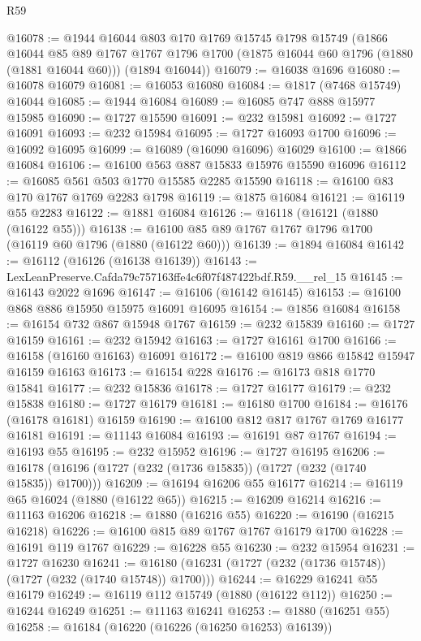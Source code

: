 \begin{lexlean}{R59}
\begin{coremodule}
@16078 := @1944
    @16044
    @803
    @170
    @1769
    @15745
    @1798
    @15749
    (@1866
      @16044
      @85
      @89
      @1767
      @1767
      @1796
      @1700
      (@1875 @16044 @60 @1796 (@1880 (@1881 @16044 @60)))
      (@1894 @16044))
@16079 := @16038 @1696
@16080 := @16078 @16079
@16081 := @16053 @16080
@16084 := @1817 (@7468 @15749) @16044
@16085 := @1944 @16084
@16089 := @16085 @747 @888 @15977 @15985
@16090 := @1727 @15590
@16091 := @232 @15981
@16092 := @1727 @16091
@16093 := @232 @15984
@16095 := @1727 @16093 @1700
@16096 := @16092 @16095
@16099 := @16089 (@16090 @16096) @16029
@16100 := @1866 @16084
@16106 := @16100 @563 @887 @15833 @15976 @15590 @16096
@16112 := @16085 @561 @503 @1770 @15585 @2285 @15590
@16118 := @16100 @83 @170 @1767 @1769 @2283 @1798
@16119 := @1875 @16084
@16121 := @16119 @55 @2283
@16122 := @1881 @16084
@16126 := @16118 (@16121 (@1880 (@16122 @55)))
@16138 := @16100 @85 @89 @1767 @1767 @1796 @1700 (@16119 @60 @1796 (@1880 (@16122 @60)))
@16139 := @1894 @16084
@16142 := @16112 (@16126 (@16138 @16139))
@16143 := LexLeanPreserve.Cafda79c757163ffe4c6f07f487422bdf.R59.__rel_15
@16145 := @16143 @2022 @1696
@16147 := @16106 (@16142 @16145)
@16153 := @16100 @868 @886 @15950 @15975 @16091 @16095
@16154 := @1856 @16084
@16158 := @16154 @732 @867 @15948 @1767
@16159 := @232 @15839
@16160 := @1727 @16159
@16161 := @232 @15942
@16163 := @1727 @16161 @1700
@16166 := @16158 (@16160 @16163) @16091
@16172 := @16100 @819 @866 @15842 @15947 @16159 @16163
@16173 := @16154 @228
@16176 := @16173 @818 @1770 @15841
@16177 := @232 @15836
@16178 := @1727 @16177
@16179 := @232 @15838
@16180 := @1727 @16179
@16181 := @16180 @1700
@16184 := @16176 (@16178 @16181) @16159
@16190 := @16100 @812 @817 @1767 @1769 @16177 @16181
@16191 := @11143 @16084
@16193 := @16191 @87 @1767
@16194 := @16193 @55
@16195 := @232 @15952
@16196 := @1727 @16195
@16206 := @16178 (@16196 (@1727 (@232 (@1736 @15835)) (@1727 (@232 (@1740 @15835)) @1700)))
@16209 := @16194 @16206 @55 @16177
@16214 := @16119 @65 @16024 (@1880 (@16122 @65))
@16215 := @16209 @16214
@16216 := @11163 @16206
@16218 := @1880 (@16216 @55)
@16220 := @16190 (@16215 @16218)
@16226 := @16100 @815 @89 @1767 @1767 @16179 @1700
@16228 := @16191 @119 @1767
@16229 := @16228 @55
@16230 := @232 @15954
@16231 := @1727 @16230
@16241 := @16180 (@16231 (@1727 (@232 (@1736 @15748)) (@1727 (@232 (@1740 @15748)) @1700)))
@16244 := @16229 @16241 @55 @16179
@16249 := @16119 @112 @15749 (@1880 (@16122 @112))
@16250 := @16244 @16249
@16251 := @11163 @16241
@16253 := @1880 (@16251 @55)
@16258 := @16184 (@16220 (@16226 (@16250 @16253) @16139))

\end{coremodule}
\end{lexlean}
